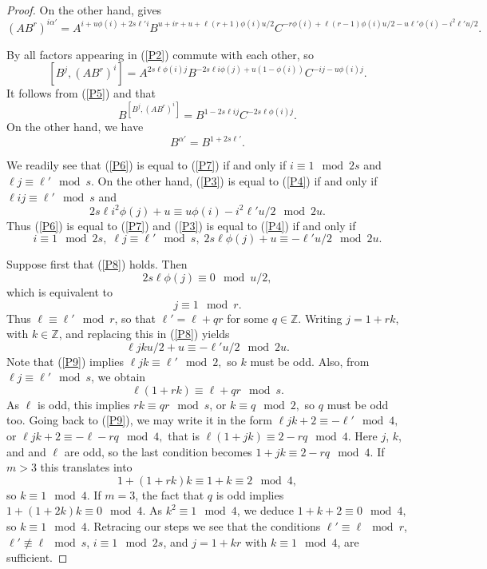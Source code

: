 \documentclass{amsart}
\theoremstyle{definition}
\theoremstyle{remark}
\newcommand \Z{{\mathbb Z}}
\begin{document}
\begin{proof}
On the other hand, \cite[Corollary 6.4]{MS3} gives
\begin{equation}
\label{P4}
(AB^r)^{i\alpha'}=A^{i+u\phi(i)+2s\ell' i}B^{u+ir+u+\ell(r+1)\phi(i)u/2}C^{-r\phi(i)+\ell(r-1)\phi(i)u/2-u\ell'\phi(i)-
i^2\ell' u/2}.
\end{equation}

By \cite[Corollary 6.1]{MS3} all factors appearing in (\ref{P2}) commute with each other, so
\begin{equation}
\label{P5}
[B^j,(AB^r)^i]=A^{2s\ell\phi(i)j}B^{-2s\ell i\phi(j)+u(1-\phi(i))}C^{-ij-u\phi(i)j}.
\end{equation}
It follows from (\ref{P5}) and \cite[Corollary 6.1]{MS3} that
\begin{equation}
\label{P6}
B^{[B^j,(AB^r)^i]}=B^{1-2s\ell ij}C^{-2s\ell\phi(i)j}.
\end{equation}
On the other hand, we have
\begin{equation}
\label{P7}
B^{\alpha'}=B^{1+2s\ell'}.
\end{equation}

We readily see that (\ref{P6}) is equal to  (\ref{P7}) if and only if $i\equiv 1\mod 2s$ and $\ell j\equiv \ell'\mod s$.
On the other hand, (\ref{P3}) is equal to (\ref{P4}) if and only if $\ell ij\equiv \ell'\mod s$ and
$$
2s\ell i^2 \phi(j) + u\equiv u \phi(i)-i^2\ell' u/2\mod 2u.
$$
Thus (\ref{P6}) is equal to  (\ref{P7}) and (\ref{P3}) is equal to (\ref{P4}) if and only if
\begin{equation}
\label{P8}
i\equiv 1\mod 2s,\; \ell j\equiv \ell'\mod s,\; 2s\ell \phi(j) + u\equiv -\ell' u/2\mod 2u.
\end{equation}

Suppose first that (\ref{P8}) holds. Then
$$
2s\ell \phi(j)\equiv 0\mod u/2,
$$
which is equivalent to
$$
j\equiv 1\mod r.
$$
Thus $\ell\equiv\ell'\mod r$, so that $\ell'=\ell+qr$ for some $q\in\Z$.
Writing $j=1+rk$, with $k\in\Z$, and replacing this in (\ref{P8}) yields
\begin{equation}
\label{P9}
\ell j k u/2 + u \equiv -\ell' u/2\mod 2u.
\end{equation}
Note that (\ref{P9}) implies
$
\ell j k\equiv \ell'\mod 2,
$
so $k$ must be odd. Also, from $\ell j\equiv \ell'\mod s$, we obtain
$$
\ell (1+rk)\equiv \ell+qr\mod s.
$$
As $\ell$ is odd, this implies
$r k\equiv qr\mod s$,
or
$
k\equiv q\mod 2,
$
so $q$ must be odd too. Going back to (\ref{P9}), we may write it in the form
$
\ell j k + 2 \equiv -\ell'\mod 4,
$
or
$
\ell j k + 2 \equiv -\ell-rq\mod 4,
$
that is
$
\ell(1+jk)\equiv 2-rq\mod 4.
$
Here $j$, $k$, and and $\ell$ are odd, so the last condition becomes
$
1+jk\equiv 2-rq\mod 4.
$
If $m>3$ this translates into
$$
1+(1+rk)k\equiv 1+k\equiv 2\mod 4,
$$
so $k\equiv 1\mod 4$. If $m=3$, the fact that $q$ is odd implies
$
1+(1+2k)k\equiv 0\mod 4.
$
As $k^2\equiv 1\mod 4$, we deduce
$
1+k+2\equiv 0\mod 4,
$
so
$
k\equiv 1\mod 4.
$
Retracing our steps we see that the conditions $\ell'\equiv \ell\mod r$, $\ell'\not\equiv \ell\mod s$, $i\equiv 1\mod 2s$, and $j=1+kr$ with
$k\equiv 1\mod 4$, are sufficient.
\end{proof}
\end{document}
